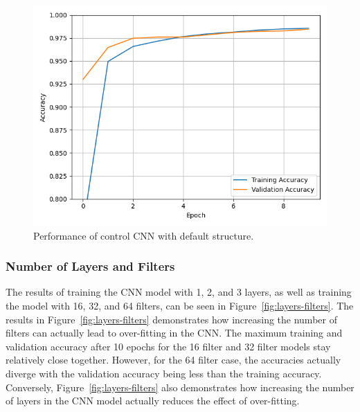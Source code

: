 \documentclass[a4paper]{article}
\begin{document}
\begin{figure}[h]
    \centering
    \includegraphics[scale=0.5]{images/control-cnn.png}
    \caption{Performance of control CNN with default structure.}
    \label{fig:control-cnn}
\end{figure}

\subsubsection{Number of Layers and Filters}

The results of training the CNN model with 1, 2, and 3 layers, as well as training the model with 16, 32, and 64 filters, can be seen in Figure~\ref{fig:layers-filters}. The results in Figure~\ref{fig:layers-filters} demonstrates how increasing the number of filters can actually lead to over-fitting in the CNN. The maximum training and validation accuracy after 10 epochs for the 16 filter and 32 filter models stay relatively close together. However, for the 64 filter case, the accuracies actually diverge with the validation accuracy being less than the training accuracy. Conversely, Figure~\ref{fig:layers-filters} also demonstrates how increasing the number of layers in the CNN model actually reduces the effect of over-fitting.
\end{document}
